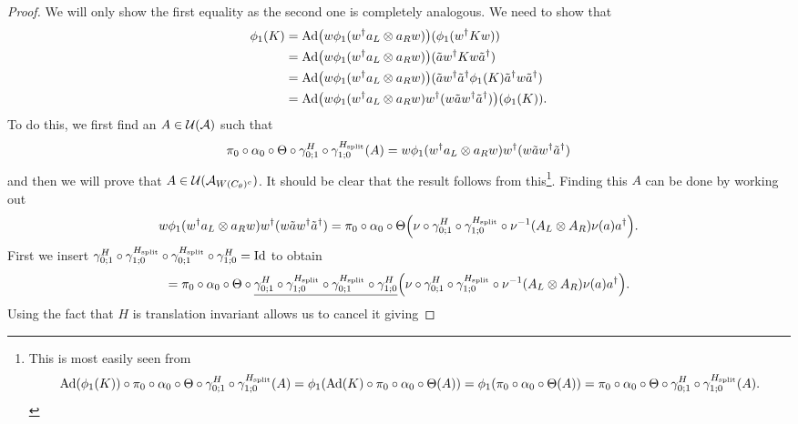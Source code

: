 \documentclass[11pt,a4paper,twoside]{article}
\numberwithin{equation}{section}
\begin{document}
	\begin{proof}
		We will only show the first equality as the second one is completely analogous. We need to show that
		\begin{align}
			\phi_1(K)&=\Ad{w\phi_1(w^\dagger a_L\otimes a_R w)}(\phi_1(w^\dagger K w))\\
			&=\Ad{w\phi_1(w^\dagger a_L\otimes a_R w)}(\tilde{a}w^\dagger K w\tilde{a}^\dagger)\\
			&=\Ad{w\phi_1(w^\dagger a_L\otimes a_R w)}(\tilde{a}w^\dagger \tilde{a}^\dagger \phi_1(K) \tilde{a}^\dagger w\tilde{a}^\dagger)\\
			&=\Ad{w\phi_1(w^\dagger a_L\otimes a_R w)w^\dagger (w \tilde{a}w^\dagger \tilde{a}^\dagger)}(\phi_1(K)).
		\end{align}
		To do this, we first find an $A\in\mathcal U(\mathcal A)$ such that
		\begin{equation}
			\pi_0\circ\alpha_0\circ\Theta\circ\gamma^H_{0;1}\circ\gamma^{{H_{\text{split}}}}_{1;0}(A)=w\phi_1(w^\dagger a_L\otimes a_R w)w^\dagger (w \tilde{a}w^\dagger \tilde{a}^\dagger)
		\end{equation}
		and then we will prove that $A\in\mathcal U(\mathcal A_{W(C_\theta)^c})$. It should be clear that the result follows from this\footnote{This is most easily seen from\begin{equation}\Ad{\phi_1(K)}\circ\pi_0\circ\alpha_0\circ\Theta\circ\gamma^H_{0;1}\circ\gamma^{\Hsplit}_{1;0}(A)=\phi_1(\Ad{K}\circ\pi_0\circ\alpha_0\circ\Theta(A))=\phi_1(\pi_0\circ\alpha_0\circ\Theta(A))=\pi_0\circ\alpha_0\circ\Theta\circ\gamma^H_{0;1}\circ\gamma^{\Hsplit}_{1;0}(A). \end{equation}}. Finding this $A$ can be done by working out
		\begin{equation}
			w\phi_1(w^\dagger a_L\otimes a_R w)w^\dagger (w \tilde{a}w^\dagger \tilde{a}^\dagger)=\pi_0\circ\alpha_0\circ\Theta\left(\nu\circ\gamma^H_{0;1}\circ\gamma^{\Hsplit}_{1;0}\circ\nu^{-1}(A_L\otimes A_R)\nu(a)a^\dagger\right).
		\end{equation}
		First we insert $\gamma^H_{0;1}\circ\gamma^{{H_{\text{split}}}}_{1;0}\circ\gamma^{{H_{\text{split}}}}_{0;1}\circ\gamma^H_{1;0}=\text{Id}$ to obtain
		\begin{equation}
			=\pi_0\circ\alpha_0\circ\Theta\circ\underline{\gamma^H_{0;1}\circ\gamma^{\Hsplit}_{1;0}\circ\gamma^{\Hsplit}_{0;1}\circ\gamma^H_{1;0}}\left(\nu\circ\gamma^H_{0;1}\circ\gamma^{\Hsplit}_{1;0}\circ\nu^{-1}(A_L\otimes A_R)\nu(a)a^\dagger\right).
		\end{equation}
		Using the fact that $H$ is translation invariant allows us to cancel it giving

\end{proof}
\end{document}

